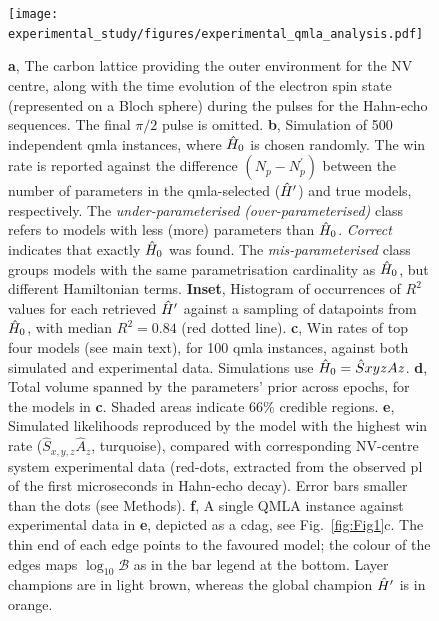 \begin{figure}
    \label{fig:exp_qmla_analysis}
    \texttt{[image: experimental\_study/figures/experimental\_qmla\_analysis.pdf]}
    \caption[\gls{qmla} applied to experimental system.]{
        \textbf{a}, 
        The carbon lattice providing the outer environment for the NV centre, along with the
        time evolution of the electron spin state (represented on a Bloch sphere) during the pulses for the Hahn-echo sequences. The final $\pi/2$ pulse is omitted.  
        \textbf{b}, 
        Simulation of 500 independent \gls{qmla} instances, where $\hat{H}_0$ is chosen randomly. 
        The win rate is reported against the difference $(N_{p}-N^{\prime}_p)$ between the 
        number of parameters in the \gls{qmla}-selected ($\hat{H}^{\prime}$) and true models, respectively. 
        The \emph{under-parameterised} \emph{ (over-parameterised)} class refers to models with less (more) 
        parameters than $\hat{H}_0$. 
        \emph{Correct} indicates that exactly $\hat{H}_0$ was found. 
        The \emph{mis-parameterised} class groups models with the same parametrisation cardinality as $\hat{H}_0$, but different Hamiltonian terms. 
        \textbf{Inset}, Histogram of occurrences of $R^2$ values for each retrieved $\hat{H}^{\prime}$ 
        against a sampling of datapoints from $\hat{H}_0$, with median $R^2=0.84$ (red dotted line). 
        \textbf{c}, 
        Win rates of top four models (see main text), for 100 \gls{qmla} instances, 
        against both simulated and experimental data. 
        Simulations use $\hat{H}_0 = \hat{S}xyzAz$.
        \textbf{d}, 
        Total volume spanned by the parameters' prior across epochs, for the models in \textbf{c}. 
        Shaded areas indicate $66\%$ credible regions. 
        \textbf{e}, 
        Simulated likelihoods reproduced by the model with the highest win rate ($\hat{S}_{x,y,z}\hat{A}_{z}$, turquoise), compared with corresponding NV-centre system experimental data (red-dots, extracted from the observed \gls{pl} {of the first microseconds in Hahn-echo decay}). 
        Error bars smaller than the dots (see Methods).
        \textbf{f}, 
        A single QMLA instance against experimental data in \textbf{e}, depicted as a \gls{cdag}, see Fig.~\ref{fig:Fig1}c.
        The thin end of each edge points to the favoured model; 
        the colour of the edges maps $\log_{10}\mathcal{B}$ as in the bar legend at the bottom. 
        Layer champions \huc are in light brown, whereas the global champion $\hat{H}^{\prime}$  is in orange.    
    }
\end{figure}
